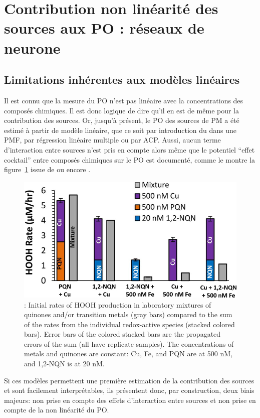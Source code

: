 \section{Contribution non linéarité des sources aux PO : réseaux de neurone}

\subsection{Limitations inhérentes aux modèles linéaires}%
\label{sub:limitations_inhérentes_aux_modèles_linéaires}


Il est connu que la mesure du PO n'est pas linéaire avec la concentrations des composés
chimiques. Il est donc logique de dire qu'il en est de même pour la contribution des
sources.
Or, jusqu'à présent, le PO des sources de PM a été estimé à partir de modèle linéaire,
que ce soit par introduction du \POv{} dans une PMF, par régression linéaire multiple ou
par ACP.
Aussi, aucun terme d'interaction entre sources n'est pris en compte alors même que
le potentiel ``effet cocktail'' entre composés chimiques sur le PO est documenté, comme le
montre la figure~\ref{fig:charrier_hydrogen_2014_fig4} issue de
\cite{charrierHydrogen2014} ou encore 
\cites[figure S7 du supplément]{charrierDithiothreitol2012}{xiongRethinking2017}{samakeUnexpected2017}.

\begin{figure}[ht]
    \centering
    \includegraphics[width=0.5\linewidth]{figures/chapter05/charrier_hydrogen_2014_fig4.jpg}
    \caption{\cite[figure 4]{charrierHydrogen2014}: Initial rates of HOOH production in
    laboratory mixtures of quinones and/or transition metals (gray bars) compared to the
    sum of the rates from the individual redox-active species (stacked colored bars). Error
    bars of the colored stacked bars are the propagated errors of the sum (all have replicate
    samples). The concentrations of metals and quinones are constant: Cu, Fe, and PQN are at
    500 nM, and 1,2-NQN is at 20 nM.}%
    \label{fig:charrier_hydrogen_2014_fig4}
\end{figure}

Si ces modèles permettent une première estimation de la contribution des sources et sont
facilement interprétables, ils présentent donc, par construction, deux biais majeurs: non
prise en compte des effets d'interaction entre sources et non prise en compte de la non
linéarité du PO.


